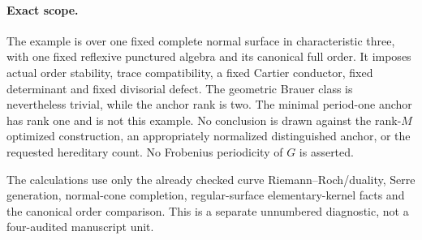 \paragraph{Exact scope.}
The example is over one fixed complete normal surface in
characteristic three, with one fixed reflexive punctured
algebra and its canonical full order. It imposes actual
order stability, trace compatibility, a fixed Cartier
conductor, fixed determinant and fixed divisorial defect.
The geometric Brauer class is nevertheless trivial, while
the anchor rank is two. The minimal period-one anchor has
rank one and is not this example. No conclusion is drawn
against the rank-$M$ optimized construction, an appropriately
normalized distinguished anchor, or the requested hereditary
count. No Frobenius periodicity of $G$ is asserted.

The calculations use only the already checked curve
Riemann--Roch/duality, Serre generation, normal-cone
completion, regular-surface elementary-kernel facts and
the canonical order comparison. This is a separate
unnumbered diagnostic, not a four-audited manuscript unit.

